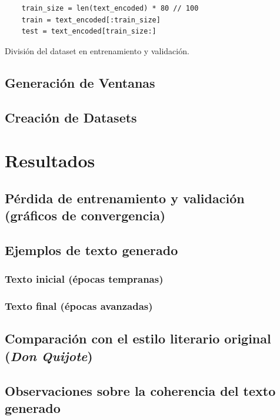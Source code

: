 \documentclass{article}
\begin{document}
\begin{listing}[H]
\begin{verbatim}
    train_size = len(text_encoded) * 80 // 100
    train = text_encoded[:train_size]
    test = text_encoded[train_size:]
\end{verbatim}
\caption{División del dataset en entrenamiento y validación.}
\end{listing}

\subsection{Generación de Ventanas}
\subsection{Creación de Datasets}


\section{Resultados}
\subsection{Pérdida de entrenamiento y validación (gráficos de convergencia)}
\subsection{Ejemplos de texto generado}
\subsubsection{Texto inicial (épocas tempranas)}
\subsubsection{Texto final (épocas avanzadas)}
\subsection{Comparación con el estilo literario original (\textit{Don Quijote})}
\subsection{Observaciones sobre la coherencia del texto generado}

\newpage
\end{document}
